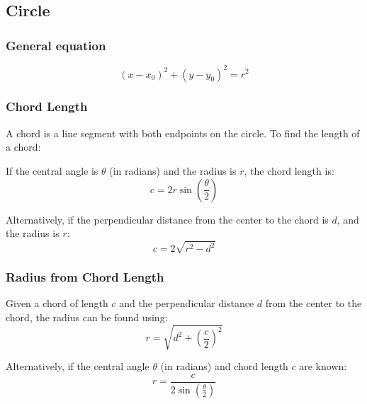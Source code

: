 \subsection{Circle}

\subsubsection{General equation}
\[
    (x - x_0)^2 + (y - y_0)^2 = r^2
\]

\subsubsection{Chord Length}

A chord is a line segment with both endpoints on the circle. To find the length of a chord:

If the central angle is $\theta$ (in radians) and the radius is $r$, the chord length is:
\[
    c = 2r \sin\left(\frac{\theta}{2}\right)
\]

Alternatively, if the perpendicular distance from the center to the chord is $d$, and the radius is $r$:
\[
    c = 2\sqrt{r^2 - d^2}
\]

\subsubsection{Radius from Chord Length}

Given a chord of length $c$ and the perpendicular distance $d$ from the center to the chord, the radius can be found using:
\[
    r = \sqrt{d^2 + \left(\frac{c}{2}\right)^2}
\]

Alternatively, if the central angle $\theta$ (in radians) and chord length $c$ are known:
\[
    r = \frac{c}{2 \sin\left(\frac{\theta}{2}\right)}
\]

